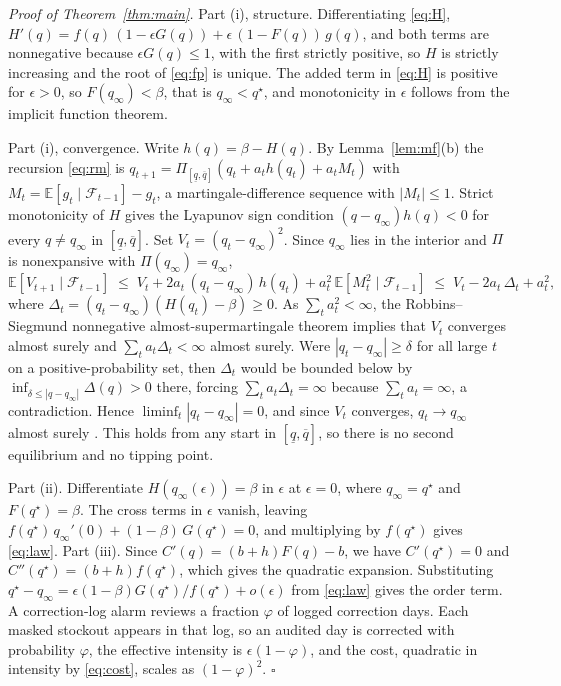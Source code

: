 \documentclass[11pt]{article}
\theoremstyle{plain}
\begin{document}
\noindent\textit{Proof of Theorem~\ref{thm:main}.}
Part (i), structure. Differentiating \eqref{eq:H},
$H'(q)=f(q)\,(1-\epsilon G(q))+\epsilon\,(1-F(q))\,g(q)$, and both terms are
nonnegative because $\epsilon G(q)\le1$, with the first strictly positive, so $H$
is strictly increasing and the root of \eqref{eq:fp} is unique. The added term in
\eqref{eq:H} is positive for $\epsilon>0$, so $F(q_\infty)<\beta$, that is
$q_\infty<q^\star$, and monotonicity in $\epsilon$ follows from the implicit
function theorem.

Part (i), convergence. Write $h(q)=\beta-H(q)$. By Lemma~\ref{lem:mf}(b) the
recursion \eqref{eq:rm} is $q_{t+1}=\Pi_{[\underline q,\overline q]}(q_t+a_t h(q_t)
+a_t M_t)$ with $M_t=\mathbb E[g_t\mid\mathcal F_{t-1}]-g_t$, a martingale-difference
sequence with $|M_t|\le1$. Strict monotonicity of $H$ gives the Lyapunov sign
condition $(q-q_\infty)h(q)<0$ for every $q\ne q_\infty$ in
$[\underline q,\overline q]$. Set $V_t=(q_t-q_\infty)^2$. Since $q_\infty$ lies in
the interior and $\Pi$ is nonexpansive with $\Pi(q_\infty)=q_\infty$,
\[
  \mathbb E[V_{t+1}\mid\mathcal F_{t-1}]
  \;\le\; V_t+2a_t\,(q_t-q_\infty)\,h(q_t)+a_t^2\,\mathbb E[M_t^2\mid\mathcal F_{t-1}]
  \;\le\; V_t-2a_t\,\Delta_t+a_t^2,
\]
where $\Delta_t=(q_t-q_\infty)(H(q_t)-\beta)\ge0$. As $\sum_t a_t^2<\infty$, the
Robbins--Siegmund nonnegative almost-supermartingale theorem
\citep{robbins1971convergence} implies that $V_t$ converges almost surely and
$\sum_t a_t\Delta_t<\infty$ almost surely. Were $|q_t-q_\infty|\ge\delta$ for all
large $t$ on a positive-probability set, then $\Delta_t$ would be bounded below by
$\inf_{\delta\le|q-q_\infty|}\Delta(q)>0$ there, forcing $\sum_t a_t\Delta_t=\infty$
because $\sum_t a_t=\infty$, a contradiction. Hence $\liminf_t|q_t-q_\infty|=0$, and
since $V_t$ converges, $q_t\to q_\infty$ almost surely
\citep{robbins1951stochastic,kushner2003stochastic}. This holds from any start in
$[\underline q,\overline q]$, so there is no second equilibrium and no tipping
point.

Part (ii). Differentiate $H(q_\infty(\epsilon))=\beta$ in $\epsilon$ at
$\epsilon=0$, where $q_\infty=q^\star$ and $F(q^\star)=\beta$. The cross terms in
$\epsilon$ vanish, leaving $f(q^\star)\,q_\infty'(0)+(1-\beta)\,G(q^\star)=0$, and
multiplying by $f(q^\star)$ gives \eqref{eq:law}.
Part (iii). Since $C'(q)=(b+h)F(q)-b$, we have $C'(q^\star)=0$ and
$C''(q^\star)=(b+h)f(q^\star)$, which gives the quadratic expansion. Substituting
$q^\star-q_\infty=\epsilon(1-\beta)G(q^\star)/f(q^\star)+o(\epsilon)$ from
\eqref{eq:law} gives the order term. A correction-log alarm reviews a fraction
$\varphi$ of logged correction days. Each masked stockout appears in that log, so
an audited day is corrected with probability $\varphi$, the effective intensity is
$\epsilon(1-\varphi)$, and the cost, quadratic in intensity by \eqref{eq:cost},
scales as $(1-\varphi)^2$. \hfill$\square$
\end{document}
